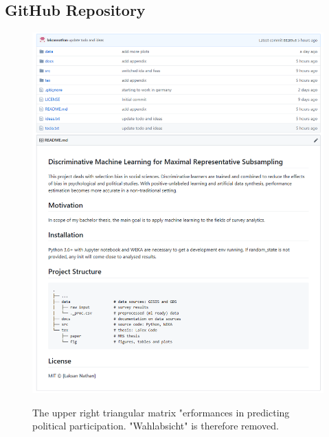 \begin{appendices}
\chapter{GitHub Repository}

\begin{figure}[ht]
	\begin{center}
		\includegraphics[scale=0.48,angle=0]{fig/github}
		\label{std}
\caption{The upper right triangular matrix  "erformances in predicting political participation. "Wahlabsicht" is therefore removed.}
	\end{center}
\end{figure}


\end{appendices}